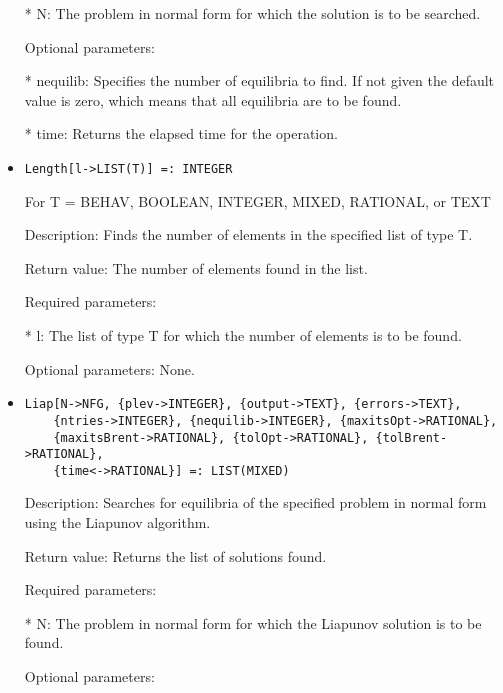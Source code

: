 \begin{itemize}
\bd
\item
[* N:] The problem in normal form for which the solution is to be 
searched.
\ed

\item
[Optional parameters:]\hfil\null

\bd
\item
[* nequilib:] Specifies the number of equilibria to find.  If not
given the default value is zero, which means that all 
equilibria are to be found.
\item
[* time:] Returns the elapsed time for the operation.
\ed
\ed

\item
\begin{verbatim}
Length[l->LIST(T)] =: INTEGER
\end{verbatim}
	For T = BEHAV, BOOLEAN, INTEGER, MIXED, RATIONAL, or TEXT

\bd
\item
[Description:] Finds the number of elements in the specified list of 
type T.
\item
[Return value:] The number of elements found in the list.
\item
[Required parameters:]\hfil\null

\bd
\item
[* l:] The list of type T for which the number of elements is to be found.
\ed

\item
[Optional parameters:] None.
\ed

\item
\begin{verbatim}
Liap[N->NFG, {plev->INTEGER}, {output->TEXT}, {errors->TEXT}, 
	{ntries->INTEGER}, {nequilib->INTEGER}, {maxitsOpt->RATIONAL},
	{maxitsBrent->RATIONAL}, {tolOpt->RATIONAL}, {tolBrent->RATIONAL},
	{time<->RATIONAL}] =: LIST(MIXED)
\end{verbatim}

\bd
\item
[Description:] Searches for equilibria of the specified problem in 
normal form using the Liapunov algorithm.
\item
[Return value:] Returns the list of solutions found.
\item
[Required parameters:]\hfil\null

\bd
\item
[* N:] The problem in normal form for which the Liapunov solution is 
to be found.
\ed

\item
[Optional parameters:]\hfil\null


\end{itemize}
